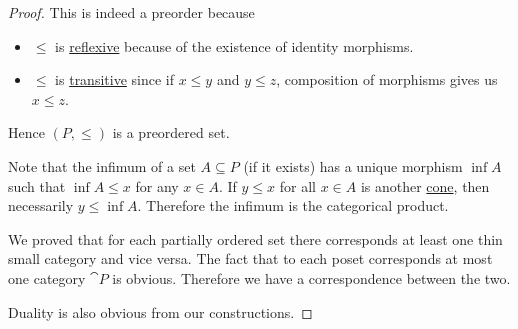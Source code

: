 \begin{proof}
  This is indeed a preorder because
  \begin{itemize}
    \item \( \leq \) is \hyperref[def:binary_relation/reflexive]{reflexive} because of the existence of identity morphisms.
    \item \( \leq \) is \hyperref[def:binary_relation/transitive]{transitive} since if \( x \leq y \) and \( y \leq z \), composition of morphisms gives us \( x \leq z \).
  \end{itemize}

  Hence \( (P, \leq) \) is a preordered set.

  Note that the infimum of a set \( A \subseteq P \) (if it exists) has a unique morphism \( \inf A \) such that \( \inf A \leq x \) for any \( x \in A \). If \( y \leq x \) for all \( x \in A \) is another \hyperref[def:categorical_cone]{cone}, then necessarily \( y \leq \inf A \). Therefore the infimum is the categorical product.

  We proved that for each partially ordered set there corresponds at least one thin small category and vice versa. The fact that to each poset corresponds at most one category \( \cat{P} \) is obvious. Therefore we have a correspondence between the two.

  Duality is also obvious from our constructions.
\end{proof}

